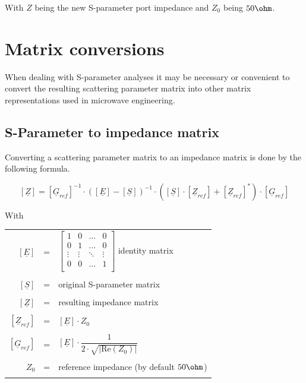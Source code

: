 \documentclass[10pt]{report}
\begin{document}
With $Z$ being the new S-parameter port impedance and $Z_0$ being $50\ohm$.

\section{Matrix conversions}

When dealing with S-parameter analyses it may be necessary or
convenient to convert the resulting scattering parameter matrix into
other matrix representations used in microwave engineering.

\subsection{S-Parameter to impedance matrix}

Converting a scattering parameter matrix to an impedance matrix is
done by the following formula.

\begin{equation}
\left[
\underline{Z}
\right]
=
\left[
\underline{G}_{ref}
\right]^{-1}
\cdot
\left(
\left[\underline{E}\right] - \left[\underline{S}\right]
\right)^{-1}
\cdot
\left(
\left[\underline{S}\right] \cdot \left[\underline{Z}_{ref}\right] + \left[\underline{Z}_{ref}\right]^{*}
\right)
\cdot
\left[\underline{G}_{ref}\right]
\end{equation}

With

\addvspace{12pt}

\begin{tabular}{rll}
$\left[\underline{E}\right]$ & = &
$\begin{bmatrix}
1 & 0 & \ldots & 0\\
0 & 1 & \ldots & 0\\
\vdots & \vdots & \ddots & \vdots\\
0 & 0 & \ldots & 1\\
\end{bmatrix}$
identity matrix\\& &\\
$\left[\underline{S}\right]$ & = & original S-parameter matrix\\& &\\
$\left[\underline{Z}\right]$ & = & resulting impedance matrix\\& &\\
$\left[\underline{Z}_{ref}\right]$ & = &
$\left[\underline{E}\right] \cdot Z_{0}$\\& &\\
$\left[\underline{G}_{ref}\right]$ & = &
$\left[\underline{E}\right] \cdot 
\dfrac{1}{2\cdot \sqrt{\left| \text{Re}\left(Z_{0}\right)\right|}}$\\& &\\
$Z_{0}$ & = & reference impedance (by default $50\ohm$)\\& &\\
\end{tabular}
\end{document}
